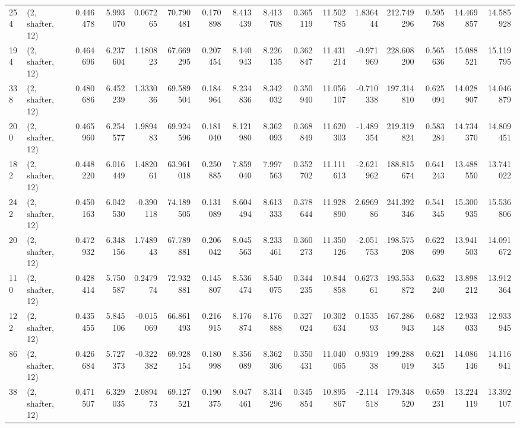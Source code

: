 \begin{tabular}{llrrrrrrrrrrrrrr}
254 &  (2, shafter, 12) &   0.446478 &   5.993070 &   0.067265 &    70.790481 &   0.170898 &   8.413439 &   8.413708 &  0.365119 &  11.502785 &   1.836444 &   212.749296 &  0.595768 &  14.469857 &  14.585928 \\
194 &  (2, shafter, 12) &   0.464696 &   6.237604 &   1.180823 &    67.669295 &   0.207454 &   8.140943 &   8.226135 &  0.362847 &  11.431214 &  -0.971969 &   228.608200 &  0.565636 &  15.088521 &  15.119795 \\
338 &  (2, shafter, 12) &   0.480686 &   6.452239 &   1.333036 &    69.589504 &   0.184964 &   8.234836 &   8.342032 &  0.350940 &  11.056107 &  -0.710338 &   197.314810 &  0.625094 &  14.028907 &  14.046879 \\
200 &  (2, shafter, 12) &   0.465960 &   6.254577 &   1.989483 &    69.924596 &   0.181040 &   8.121980 &   8.362093 &  0.368849 &  11.620303 &  -1.489354 &   219.319824 &  0.583284 &  14.734370 &  14.809451 \\
182 &  (2, shafter, 12) &   0.448220 &   6.016449 &   1.482061 &    63.961018 &   0.250885 &   7.859040 &   7.997563 &  0.352702 &  11.111613 &  -2.621962 &   188.815674 &  0.641243 &  13.488550 &  13.741022 \\
242 &  (2, shafter, 12) &   0.450163 &   6.042530 &  -0.390118 &    74.189505 &   0.131089 &   8.604494 &   8.613333 &  0.378644 &  11.928890 &   2.696986 &   241.392346 &  0.541345 &  15.300935 &  15.536806 \\
20  &  (2, shafter, 12) &   0.472932 &   6.348156 &   1.748943 &    67.789881 &   0.206042 &   8.045563 &   8.233461 &  0.360273 &  11.350126 &  -2.051753 &   198.575208 &  0.622699 &  13.941503 &  14.091672 \\
110 &  (2, shafter, 12) &   0.428414 &   5.750587 &   0.247974 &    72.932881 &   0.145807 &   8.536474 &   8.540075 &  0.344235 &  10.844858 &   0.627361 &   193.553872 &  0.632240 &  13.898212 &  13.912364 \\
122 &  (2, shafter, 12) &   0.435455 &   5.845106 &  -0.015069 &    66.861493 &   0.216915 &   8.176874 &   8.176888 &  0.327024 &  10.302634 &   0.153593 &   167.286943 &  0.682148 &  12.933033 &  12.933945 \\
86  &  (2, shafter, 12) &   0.426684 &   5.727373 &  -0.322382 &    69.928154 &   0.180998 &   8.356089 &   8.362306 &  0.350431 &  11.040065 &   0.931938 &   199.288019 &  0.621345 &  14.086146 &  14.116941 \\
38  &  (2, shafter, 12) &   0.471507 &   6.329035 &   2.089473 &    69.127521 &   0.190375 &   8.047461 &   8.314296 &  0.345854 &  10.895867 &  -2.114518 &   179.348520 &  0.659231 &  13.224119 &  13.392107 \\

\end{tabular}
